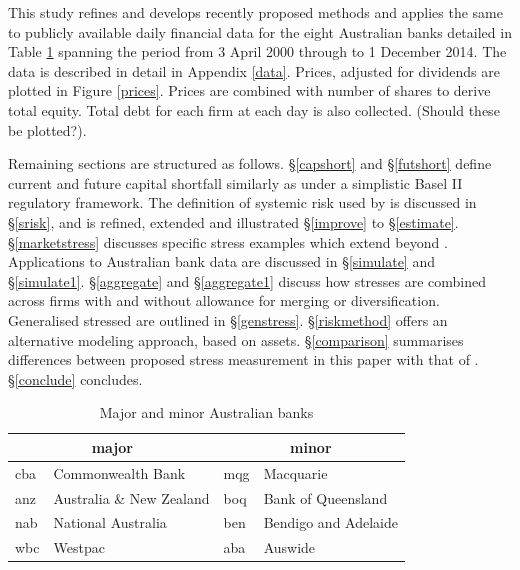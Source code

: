 \documentclass[authoryear]{elsarticle}
\newcommand{\fref}[1]{Figure \ref{#1}}
\newcommand{\sref}[1]{\S\ref{#1}}
\newcommand{\tref}[1]{Table \ref{#1}}
\newcommand{\aref}[1]{Appendix \ref{#1}}
\begin{document}
This study refines and develops recently proposed methods and applies the same to publicly available daily financial data for  the eight  Australian banks detailed in \tref{eightbanks} spanning the period from   3 April 2000 through to 1 December 2014.  The data is described in detail in \aref{data}.  Prices, adjusted for dividends are plotted in \fref{prices}.   Prices are combined with number of shares to derive total equity.    Total debt for each firm at each day is also collected.  (Should these be plotted?).


Remaining sections are structured as follows. \sref{capshort} and \sref{futshort} define current and future  capital shortfall similarly as \cite{brownlees2015} under a simplistic Basel II regulatory framework. The definition of systemic risk used by \cite{brownlees2015} is discussed in \sref{srisk}, and is refined, extended and illustrated \sref{improve} to \sref{estimate}. \sref{marketstress} discusses specific stress examples which extend beyond \cite{brownlees2015}. Applications to Australian bank data are discussed in \sref{simulate} and \sref{simulate1}. \sref{aggregate} and \sref{aggregate1} discuss how stresses are combined across firms with and without allowance for merging or diversification. Generalised stressed are outlined in \sref{genstress}. \sref{riskmethod} offers an alternative modeling approach, based on assets. \sref{comparison} summarises differences between proposed stress measurement in this paper with that of 
\cite{brownlees2015}. \sref{conclude} concludes.

\begin{table}[htdp]
\label{banks}\caption{Major and minor Australian banks}\label{eightbanks}
\begin{center}
\begin{tabular}{l|l||l|l}
\hline
 \multicolumn{2}{c||}{major}& \multicolumn{2}{c}{minor}\\
 \hline
cba & Commonwealth Bank  & mqg & Macquarie \\
anz & Australia \& New Zealand  & boq & Bank of Queensland\\
nab & National Australia  & ben & Bendigo and Adelaide \\
wbc & Westpac & aba & Auswide \\
\hline
\end{tabular}
\end{center}
\end{table}%
\end{document}
